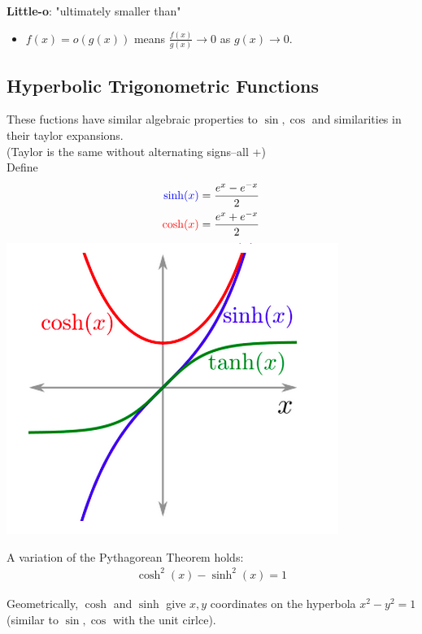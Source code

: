 \documentclass[a4paper, 12pt]{article}
\newcommand{\bt}[1]{\textbf{#1}} %
\newcommand{\eq}[1]{\begin{align*}#1\end{align*}} %
\renewcommand{\eq}[1]{\begin{align*}#1\end{align*}} %
\newcommand{\gray}[1]{\textcolor[gray]{0.5}{#1}} %
\newcommand{\blue}[1]{\textcolor{blue}{#1}} %
\newcommand{\tab}{\phantom{ssss}}
\begin{document}
\noindent \bt{Little-o}: "ultimately smaller than"
\begin{itemize}
    \item $f(x) = o(g(x))$ means $\displaystyle \frac{f(x)}{g(x)} \rightarrow 0$ as $g(x) \rightarrow 0$.
\end{itemize}


\subsection{Hyperbolic Trigonometric Functions}

These fuctions have similar algebraic properties to $\sin, \cos$ and similarities in their taylor expansions. \\
\gray{(Taylor is the same without alternating signs--all +)}\\
Define 
\eq{
\blue{\sinh(x)} = \frac{e^x - e^{-x}}{2} \\
\textcolor{red}{\cosh(x)} = \frac{e^{x} + e^{-x}}{2} \\
}
\includegraphics[scale=0.5]{htrig.png}

A variation of the Pythagorean Theorem holds: 
\eq{
\cosh^2(x) - \sinh^2(x) = 1
}

Geometrically, $\cosh$ and $\sinh$ give $x,y$ coordinates on the hyperbola $x^2 - y^2=1$ \\
\tab \tab (similar to $\sin, \cos$ with the unit cirlce).\\
\end{document}
